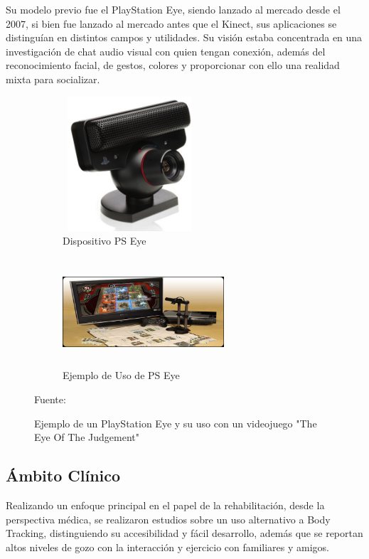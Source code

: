 Su modelo previo fue el PlayStation Eye, siendo lanzado al mercado desde el 2007, si bien fue lanzado al mercado antes que el Kinect, sus aplicaciones se distinguían en distintos campos y utilidades. Su visión estaba concentrada en una investigación de chat audio visual con quien tengan conexión, además del reconocimiento facial, de gestos, colores y proporcionar con ello una realidad mixta para socializar.
\begin{figure}
	\centering
	\begin{subfigure}{0.5\textwidth}
		\centering
		\includegraphics[width=5cm,height=5cm,]{./Images/eyeex.jpg}
		\caption{Dispositivo PS Eye}
		\label{eyeex}
	\end{subfigure}%
	\begin{subfigure}{0.5\textwidth}
		\centering
		\includegraphics[width=6cm,height=4cm,]{./Images/eyeexuse.jpg}
		\caption{Ejemplo de Uso de PS Eye}
		\label{eyeexuse}
	\end{subfigure}
	\caption{Ejemplo de un PlayStation Eye y su uso con un videojuego "The Eye Of The Judgement"}
	\footnotesize Fuente: \cite{eyeex} \cite{eyeexuse}
	\label{eyeExample}
\end{figure}

\subsection{Ámbito Clínico}
Realizando un enfoque principal en el papel de la rehabilitación, desde la perspectiva médica, se realizaron estudios sobre un uso alternativo a Body Tracking, distinguiendo su accesibilidad y fácil desarrollo, además que se reportan altos niveles de gozo con la interacción y ejercicio con familiares y amigos. 

